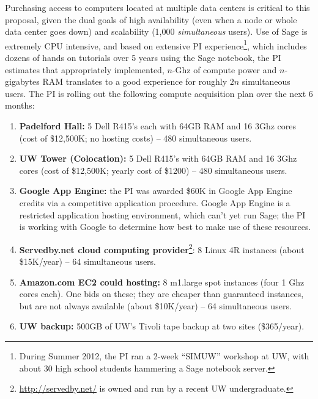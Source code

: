 \documentclass[11pt]{article}
\begin{document}
Purchasing access to computers located at multiple data centers is
critical to this proposal, given the dual goals of high availability
(even when a node or whole data center goes down) and scalability
(1,000 {\em simultaneous} users).  Use of Sage is extremely CPU
intensive, and based on extensive PI experience\footnote{During Summer
  2012, the PI ran a 2-week ``SIMUW'' workshop at UW, with about 30
  high school students hammering a Sage notebook server.}, which
includes dozens of hands on tutorials over 5 years using the Sage
notebook, the PI estimates that appropriately implemented, $n$-Ghz
of compute power and $n$-gigabytes RAM translates to a good experience
for roughly $2n$ simultaneous users.  The PI is rolling out the
following compute acquisition plan over the next 6 months:

\begin{enumerate}
\item {\bf Padelford Hall:} 5 Dell R415's each with 64GB RAM
  and 16 3Ghz cores (cost of \$12,500K; no hosting costs) --
  480 simultaneous users. 

\item {\bf UW Tower (Colocation):} 5 Dell R415's with
  64GB RAM and 16 3Ghz cores (cost of \$12,500K; yearly
  cost of \$1200) -- 480 simultaneous users. 

\item {\bf Google App Engine:} the PI was awarded \$60K in Google App
  Engine credits via a competitive application procedure.  Google App
  Engine is a restricted application hosting environment, which can't
  yet run Sage; the PI is working with Google to determine how best to
  make use of these resources.

\item {\bf Servedby.net cloud computing
  provider}\footnote{\url{http://servedby.net/} is owned and run by a
  recent UW undergraduate.}: 8 Linux 4R instances (about \$15K/year)
  -- 64 simultaneous users.

\item {\bf Amazon.com EC2 could hosting:} 8 m1.large spot instances
  (four 1 Ghz cores each).  One bids on these; they are cheaper than
  guaranteed instances, but are not always available (about
  \$10K/year) -- 64 simultaneous users.

\item {\bf UW backup:} 500GB of UW's Tivoli tape backup
  at two sites (\$365/year).

\end{enumerate}
\end{document}
